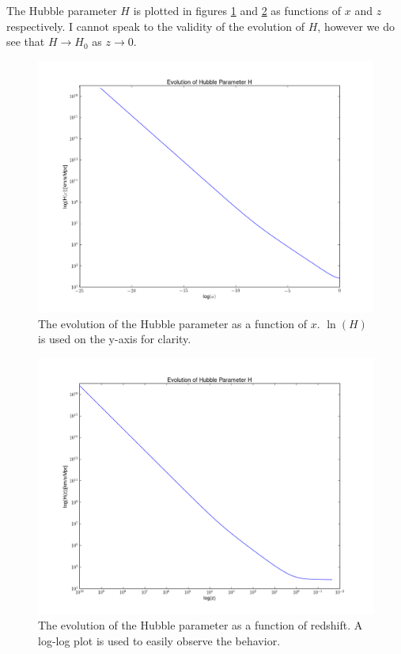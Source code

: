 \documentclass[a4paper]{article}
\begin{document}
\clearpage

The Hubble parameter $H$ is plotted in figures \ref{fig:hx} and \ref{fig:hz} as functions of $x$ and $z$ respectively. I cannot speak to the validity of the evolution of $H$, however we do see that $H \rightarrow H_0$ as $z \rightarrow 0$. 
\begin{center}
\centering
\begin{figure}[ht!]\label{fig:hx}
\centering
\includegraphics[scale=0.35]{hx}
\caption{The evolution of the Hubble parameter as a function of $x$. $\ln(H)$ is used on the y-axis for clarity.}
\end{figure}

\begin{figure}[h!]\label{fig:hz}
\centering
\includegraphics[scale=0.35]{hz}
\caption{The evolution of the Hubble parameter as a function of redshift. A log-log plot is used to easily observe the behavior.}
\end{figure}
\end{center}
\end{document}
